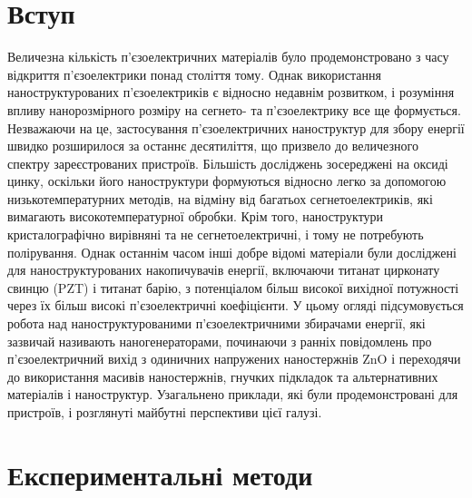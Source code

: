 \documentclass[a4paper,14pt]{extreport}
\begin{document}
\newpage

\chapter{Вступ}\par
Величезна кількість п'єзоелектричних матеріалів було продемонстровано з часу відкриття п'єзоелектрики понад століття тому. Однак використання наноструктурованих п’єзоелектриків є відносно недавнім розвитком, і розуміння впливу нанорозмірного розміру на сегнето- та п’єзоелектрику все ще формується. Незважаючи на це, застосування п’єзоелектричних наноструктур для збору енергії швидко розширилося за останнє десятиліття, що призвело до величезного спектру зареєстрованих пристроїв. Більшість досліджень зосереджені на оксиді цинку, оскільки його наноструктури формуються відносно легко за допомогою низькотемпературних методів, на відміну від багатьох сегнетоелектриків, які вимагають високотемпературної обробки. Крім того, наноструктури кристалографічно вирівняні та не сегнетоелектричні, і тому не потребують полірування. Однак останнім часом інші добре відомі матеріали були досліджені для наноструктурованих накопичувачів енергії, включаючи титанат цирконату свинцю (PZT) і титанат барію, з потенціалом більш високої вихідної потужності через їх більш високі п’єзоелектричні коефіцієнти. У цьому огляді підсумовується робота над наноструктурованими п’єзоелектричними збирачами енергії, які зазвичай називають наногенераторами, починаючи з ранніх повідомлень про п’єзоелектричний вихід з одиничних напружених наностержнів ZnO і переходячи до використання масивів наностержнів, гнучких підкладок та альтернативних матеріалів і наноструктур. Узагальнено приклади, які були продемонстровані для пристроїв, і розглянуті майбутні перспективи цієї галузі.
 
 

\chapter{Експериментальні методи}\par 
\end{document}
